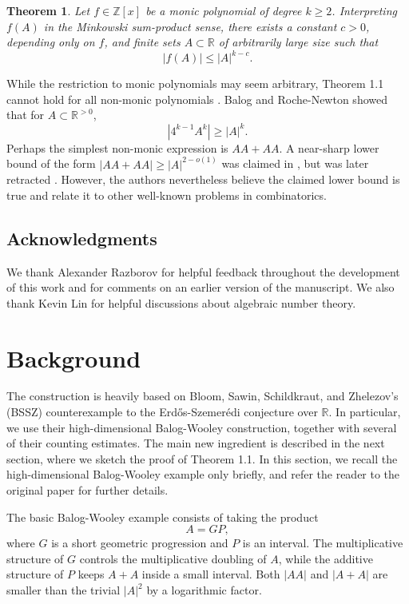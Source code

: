 \documentclass[11pt]{amsart}
\theoremstyle{plain}
\newtheorem{theorem}{Theorem}[section]
\theoremstyle{definition}\newtheorem{remark}[theorem]{Remark}
\theoremstyle{definition}\newtheorem*{remark*}{Remark}
\theoremstyle{definition}\newtheorem{definition}[theorem]{Definition}
\theoremstyle{definition}\newtheorem*{definition*}{Definition}
\theoremstyle{definition}\newtheorem*{idea}{Idea}
\theoremstyle{definition}\newtheorem*{comments}{Comment}
\theoremstyle{definition}\newtheorem{example}[theorem]{Example}
\theoremstyle{definition}\newtheorem*{example*}{Example}
\newcommand{\0}{\varnothing} %
\def\Z{\mathbb{Z}} %
\def\R{\mathbb{R}} %
\begin{document}
\begin{theorem}
Let $f\in \Z[x]$ be a monic polynomial of degree $k\geq 2$. Interpreting $f(A)$ in the Minkowski sum-product sense, there exists a constant $c>0$, depending only on $f$, and finite sets $A\subset \R$ of arbitrarily large size such that
\[
|f(A)|\leq |A|^{k-c}.
\]
\end{theorem}

While the restriction to monic polynomials may seem arbitrary, Theorem 1.1 cannot hold for all non-monic polynomials \cite{Balog2011, BalogRocheNewton2015}. Balog and Roche-Newton showed that for $A\subset\R^{>0}$, 
\[
|4^{k-1}A^k|\geq|A|^k.
\]
Perhaps the simplest non-monic expression is $AA+AA$. A near-sharp lower bound of the form $|AA+AA|\geq|A|^{2-o(1)}$ was claimed in \cite{IosevichRocheNewtonRudnev2011}, but was later retracted \cite{IosevichRocheNewtonRudnev2018}. However, the authors nevertheless believe the claimed lower bound is true and relate it to other well-known problems in combinatorics.


\subsection*{Acknowledgments} We thank Alexander Razborov for helpful feedback throughout the development of this work and for comments on an earlier version of the manuscript. We also thank Kevin Lin for helpful discussions about algebraic number theory.

\section{Background}
The construction is heavily based on Bloom, Sawin, Schildkraut, and Zhelezov's (BSSZ) counterexample to the Erd\H{o}s-Szemer\'edi conjecture over $\R$. In particular, we use their high-dimensional Balog-Wooley construction, together with several of their counting estimates. The main new ingredient is described in the next section, where we sketch the proof of Theorem 1.1. In this section, we recall the high-dimensional Balog-Wooley example only briefly, and refer the reader to the original paper \cite{BloomSawinSchildkrautZhelezov2026} for further details.

The basic Balog-Wooley example consists of taking the product
\[
A=GP,
\]
where $G$ is a short geometric progression and $P$ is an interval. The multiplicative structure of $G$ controls the multiplicative doubling of $A$, while the additive structure of $P$ keeps $A+A$ inside a small interval. Both $|AA|$ and $|A+A|$ are smaller than the trivial $|A|^2$ by a logarithmic factor. 
\end{document}
